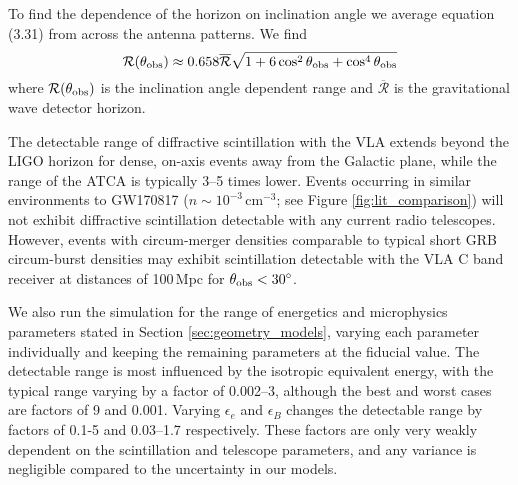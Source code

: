 \pagebreak
To find the dependence of the horizon on inclination angle we average equation (3.31) from \citet{1993PhRvD..47.2198F} across the antenna patterns. We find
\begin{equation}
    \mathcal{R}(\theta_{\rm obs}) \approx 0.658\overline{\mathcal{R}}\sqrt{1+6\cos^2\theta_{\rm obs}+\cos^4\theta_{\rm obs}}
    \label{eq:gw_inc_angle}
\end{equation}
where $\mathcal{R}(\theta_{\rm obs})$ is the inclination angle dependent range and $\overline{\mathcal{R}}$ is the gravitational wave detector horizon.

The detectable range of diffractive scintillation with the VLA extends beyond the LIGO horizon for dense, on-axis events away from the Galactic plane, while the range of the ATCA is typically 3--5 times lower. Events occurring in similar environments to GW170817 ($n\sim 10^{-3}$\,cm$^{-3}$; see Figure \ref{fig:lit_comparison}) will not exhibit diffractive scintillation detectable with any current radio telescopes. However, events with circum-merger densities comparable to typical short GRB circum-burst densities
\citep[$n\sim 10^{-2}$\,cm$^{-3}$;][]{2015ApJ...815..102F}
may exhibit scintillation detectable with the VLA C band receiver at distances of 100\,Mpc for $\theta_{\rm obs}<30\mbox{$^\circ$}$.

We also run the simulation for the range of energetics and microphysics parameters stated in Section \ref{sec:geometry_models}, varying each parameter individually and keeping the remaining parameters at the fiducial value. The detectable range is most influenced by the isotropic equivalent energy, with the typical range varying by a factor of 0.002--3, although the best and worst cases are factors of 9 and 0.001. Varying $\epsilon_e$ and $\epsilon_B$ changes the detectable range by factors of 0.1-5 and 0.03--1.7 respectively. These factors are only very weakly dependent on the scintillation and telescope parameters, and any variance is negligible compared to the uncertainty in our models.


